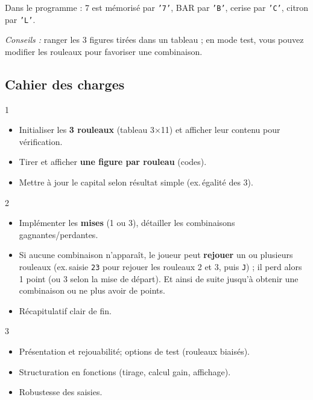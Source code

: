 Dans le programme : 7 est mémorisé par \texttt{'7'}, BAR par \texttt{'B'}, cerise par \texttt{'C'}, citron par \texttt{'L'}.

\textit{Conseils :} ranger les 3 figures tirées dans un tableau ; en mode test, vous pouvez modifier les rouleaux pour favoriser une combinaison.

\subsection*{Cahier des charges}
\begin{UPSTICahierDesCharges}{1}
\begin{itemize}
  \item Initialiser les \textbf{3 rouleaux} (tableau 3×11) et afficher leur contenu pour vérification.
  \item Tirer et afficher \textbf{une figure par rouleau} (codes).
  \item Mettre à jour le capital selon résultat simple (ex.\,égalité des 3).
\end{itemize}
\end{UPSTICahierDesCharges}

\begin{UPSTICahierDesCharges}{2}
\begin{itemize}
  \item Implémenter les \textbf{mises} (1 ou 3), détailler les combinaisons gagnantes/perdantes.
  \item Si aucune combinaison n'apparaît, le joueur peut \textbf{rejouer} un ou plusieurs rouleaux (ex.\,saisie \texttt{23} pour rejouer les rouleaux 2 et 3, puis \texttt{J}) ; il perd alors 1 point (ou 3 selon la mise de départ). Et ainsi de suite jusqu'à obtenir une combinaison ou ne plus avoir de points.
  \item Récapitulatif clair de fin.
\end{itemize}
\end{UPSTICahierDesCharges}

\begin{UPSTICahierDesCharges}{3}
\begin{itemize}
  \item Présentation et rejouabilité; options de test (rouleaux biaisés).
  \item Structuration en fonctions (tirage, calcul gain, affichage).
  \item Robustesse des saisies.
\end{itemize}
\end{UPSTICahierDesCharges}

